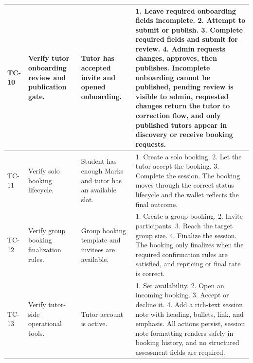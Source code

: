 \documentclass[11pt,a4paper]{article}
\begin{document}
\begin{longtable}{|L{1.2cm}|L{3.3cm}|L{3.9cm}|L{6.0cm}|}
	\hline
	TC-10          & Verify tutor onboarding review and publication gate.                                 & Tutor has accepted invite and opened onboarding.                                               & 1. Leave required onboarding fields incomplete. 2. Attempt to submit or publish. 3. Complete required fields and submit for review. 4. Admin requests changes, approves, then publishes. \newline Incomplete onboarding cannot be published, pending review is visible to admin, requested changes return the tutor to correction flow, and only published tutors appear in discovery or receive booking requests.                                                                                                                                           \\
	\hline
	TC-11          & Verify solo booking lifecycle.                                       & Student has enough Marks and tutor has an available slot.              & 1. Create a solo booking. 2. Let the tutor accept the booking. 3. Complete the session. \newline The booking moves through the correct status lifecycle and the wallet reflects the final outcome.                                                                                                              \\
	\hline
	TC-12          & Verify group booking finalization rules.                             & Group booking template and invitees are available.                     & 1. Create a group booking. 2. Invite participants. 3. Reach the target group size. 4. Finalize the session. \newline The booking only finalizes when the required confirmation rules are satisfied, and repricing or final rate is correct.                                                                     \\
	\hline
	TC-13          & Verify tutor-side operational tools.                                 & Tutor account is active.                                               & 1. Set availability. 2. Open an incoming booking. 3. Accept or decline it. 4. Add a rich-text session note with heading, bullets, link, and emphasis. \newline All actions persist, session note formatting renders safely in booking history, and no structured assessment fields are required.                                                                                                                                           \\

\end{longtable}
\end{document}
